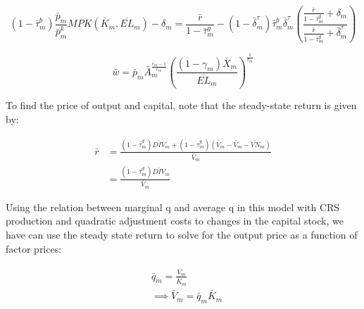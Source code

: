 \documentclass[letterpaper,12pt]{article}
\theoremstyle{definition}
\begin{document}
\begin{spacing}{1.5}
\begin{equation}
(1-\bar{\tau}^{b}_{m})\frac{\bar{p}_{m}}{\bar{p}^{k}_{m}}MPK(\bar{K}_{m},\overline{EL}_{m}) - \delta_{m} = \frac{\bar{r}}{1-\bar{\tau}^{g}_{m}}-(1-\bar{\delta}^{\tau}_{m})\bar{\tau}^{b}_{m}\bar{\delta}^{\tau}_{m}\left(\frac{\frac{\bar{r}}{1-\bar{\tau}^{g}_{m}}+\delta_{m}}{\frac{\bar{r}}{1-\bar{\tau}^{g}_{m}}+\bar{\delta}^{\tau}_{m}}\right)
\end{equation}

\begin{equation}
\bar{w} = \bar{p}_{m}\bar{A}_{m}^{\frac{\epsilon_{m}-1}{\epsilon_{m}}}\left(\frac{(1-\gamma_{m})\bar{X}_{m}}{\overline{EL}_{m}} \right)^{\frac{1}{\epsilon_{m}}} 
\end{equation}

To find the price of output and capital, note that the steady-state return is given by:

\begin{equation}
\begin{split}
\bar{r} &= \frac{(1-\bar{\tau}^{d}_{m})\overline{DIV}_{m} + (1-\tau^{g}_{m})\left(\bar{V}_{m}-\bar{V}_{m}-\overline{VN}_{m}\right)}{\bar{V}_{m}}\\
& =  \frac{(1-\bar{\tau}^{d}_{m})\overline{DIV}_{m}}{\bar{V}_{m}}
\end{split}
\end{equation}

Using the relation between marginal q and average q in this model with CRS production and quadratic adjustment costs to changes in the capital stock, we have can use the steady state return to solve for the output price as a function of factor prices:

 \begin{equation}
\begin{split}
& \bar{q}_{m} = \frac{\bar{V}_{m}}{\bar{K}_{m}} \\
& \implies \bar{V}_{m} = \bar{q}_{m}\bar{K}_{m} \\
\end{split}
\end{equation}


\end{spacing}
\end{document}

